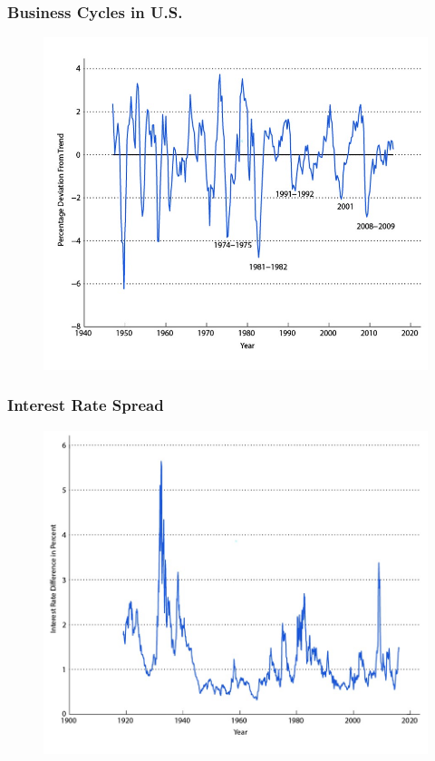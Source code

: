 \documentclass{beamer}
\begin{document}
\begin{frame}
\frametitle[alignment=center]{Business Cycles in U.S.}
\begin{figure}
\includegraphics[scale=0.6]{Figures/W_Fig_1pt13.png}
\end{figure}
\end{frame}


\begin{frame}
\frametitle[alignment=center]{Interest Rate Spread}
\begin{figure}
\includegraphics[scale=0.6]{Figures/W_Fig_1pt14.png}
\end{figure}
\end{frame}
\end{document}
